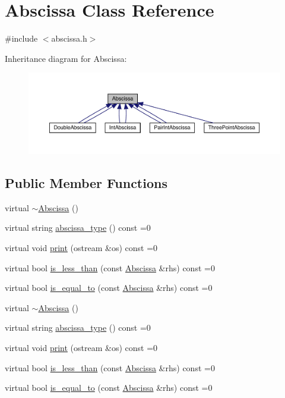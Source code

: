 \hypertarget{classAbscissa}{}\section{Abscissa Class Reference}
\label{classAbscissa}


{\ttfamily \#include $<$abscissa.\+h$>$}



Inheritance diagram for Abscissa\+:
\nopagebreak
\begin{figure}[H]
\begin{center}
\leavevmode
\includegraphics[width=350pt]{de/db8/classAbscissa__inherit__graph}
\end{center}
\end{figure}
\subsection*{Public Member Functions}
\begin{DoxyCompactItemize}
\item 
virtual \mbox{\hyperlink{classAbscissa_a09c550b42b7a2532a7df473ec008994e}{$\sim$\+Abscissa}} ()
\item 
virtual string \mbox{\hyperlink{classAbscissa_af57ffcd07eee633bb2313bc7a932f3bb}{abscissa\+\_\+type}} () const =0
\item 
virtual void \mbox{\hyperlink{classAbscissa_a98e122d32d82979bd30338abc15768fd}{print}} (ostream \&os) const =0
\item 
virtual bool \mbox{\hyperlink{classAbscissa_a399c2f7a1309368b477c767ff5f63927}{is\+\_\+less\+\_\+than}} (const \mbox{\hyperlink{classAbscissa}{Abscissa}} \&rhs) const =0
\item 
virtual bool \mbox{\hyperlink{classAbscissa_a4adf4055c1eee010f9493e0ebb66348a}{is\+\_\+equal\+\_\+to}} (const \mbox{\hyperlink{classAbscissa}{Abscissa}} \&rhs) const =0
\item 
virtual \mbox{\hyperlink{classAbscissa_a09c550b42b7a2532a7df473ec008994e}{$\sim$\+Abscissa}} ()
\item 
virtual string \mbox{\hyperlink{classAbscissa_af57ffcd07eee633bb2313bc7a932f3bb}{abscissa\+\_\+type}} () const =0
\item 
virtual void \mbox{\hyperlink{classAbscissa_a98e122d32d82979bd30338abc15768fd}{print}} (ostream \&os) const =0
\item 
virtual bool \mbox{\hyperlink{classAbscissa_a399c2f7a1309368b477c767ff5f63927}{is\+\_\+less\+\_\+than}} (const \mbox{\hyperlink{classAbscissa}{Abscissa}} \&rhs) const =0
\item 
virtual bool \mbox{\hyperlink{classAbscissa_a4adf4055c1eee010f9493e0ebb66348a}{is\+\_\+equal\+\_\+to}} (const \mbox{\hyperlink{classAbscissa}{Abscissa}} \&rhs) const =0
\end{DoxyCompactItemize}


